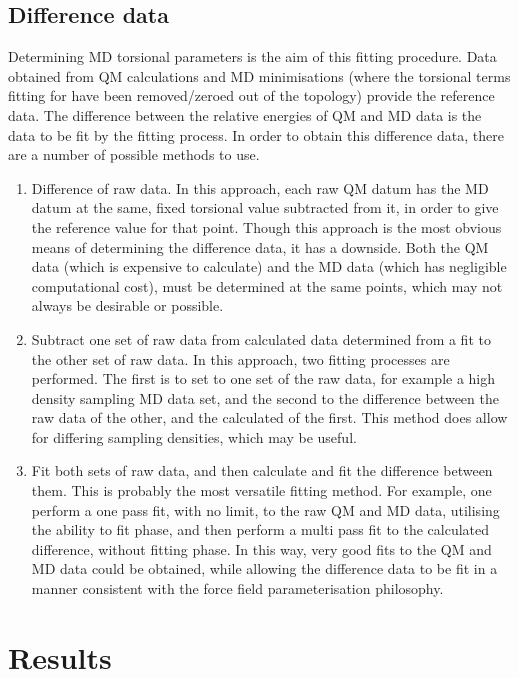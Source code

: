 \documentclass[11pt, oneside, draft]{article}   	%
\begin{document}
\subsection{Difference data}
Determining MD torsional parameters is the aim of this fitting procedure. Data obtained from QM calculations and MD minimisations (where the torsional terms fitting for have been removed/zeroed out of the topology) provide the reference data. The difference between the relative energies of QM and MD data is the data to be fit by the fitting process. In order to obtain this difference data, there are a number of possible methods to use.
\begin{enumerate}
\item Difference of raw data. In this approach, each raw QM datum has the MD datum at the same, fixed torsional value subtracted from it, in order to give the reference value for that point. Though this approach is the most obvious means of determining the difference data, it has a downside. Both the QM data (which is expensive to calculate) and the MD data (which has negligible computational cost), must be determined at the same points, which may not always be desirable or possible.
\item Subtract one set of raw data from calculated data determined from a fit to the other set of raw data. In this approach, two fitting processes are performed. The first is to set to one set of the raw data, for example a high density sampling MD data set, and the second to the difference between the raw data of the other, and the calculated of the first. This method does allow for differing sampling densities, which may be useful.
\item Fit both sets of raw data, and then calculate and fit the difference between them. This is probably the most versatile fitting method. For example, one perform a one pass fit, with no limit, to the raw QM and MD data, utilising the ability to fit phase, and then perform a multi pass fit to the calculated difference, without fitting phase. In this way, very good fits to the QM and MD data could be obtained, while allowing the difference data to be fit in a manner consistent with the force field parameterisation philosophy.
\end{enumerate}

\section{Results}
\end{document}
